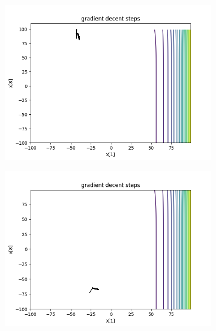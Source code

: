 	\begin{figure}[h!]
		\centering
		\begin{subfigure}[b]{0.45\linewidth}
			\includegraphics[width=\linewidth]{photos/f2_1_0.png}
		\end{subfigure}
		\begin{subfigure}[b]{0.45\linewidth}
			\includegraphics[width=\linewidth]{photos/f2_2_0.png}
		\end{subfigure}
		\begin{subfigure}[b]{0.45\linewidth}

\end{subfigure}
\end{figure}
